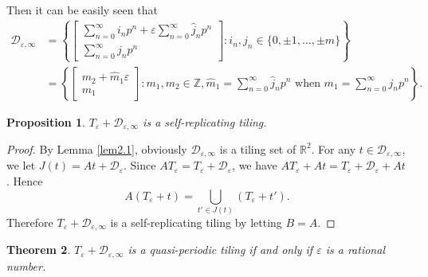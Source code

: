 \documentclass[12pt, reqno]{amsart}
\newtheorem{theorem}{Theorem}[section]
\newtheorem{Prop}[theorem]{Proposition}
\numberwithin{equation}{section}
\begin{document}
Then it can be easily seen that
\begin{align*}
{\mathcal D}_{\varepsilon,\infty} &= \left\{\left[\begin{array}{c}
\sum_{n=0}^\infty i_n p^n+ \varepsilon\sum_{n=0}^\infty \widehat{j}_n p^n\\
\sum_{n=0}^\infty j_n p^n
\end{array}\right]: i_n, j_n\in\{0,\pm1,\dots,\pm m\}\right\} \\
&=  \left\{\left[\begin{array}{c}
m_2+\widehat{m}_1\varepsilon\\
m_1
\end{array}\right]: m_1,m_2\in{\mathbb Z}, \widehat{m}_1=\sum_{n=0}^\infty \widehat{j}_n p^n \text{ when } m_1=\sum_{n=0}^\infty j_n p^n\right\}.
\end{align*}



\begin{Prop}
 $T_\varepsilon+{\mathcal D}_{\varepsilon,\infty}$ is a self-replicating tiling.
\end{Prop}


\begin{proof}
By Lemma \ref{lem2.1}, obviously ${\mathcal D}_{\varepsilon,\infty}$ is a tiling set of ${\mathbb R}^2$. For any $t\in {\mathcal D}_{\varepsilon,\infty}$, we let $J(t)=At+{\mathcal D}_\varepsilon$. Since $AT_\varepsilon=T_\varepsilon+{\mathcal D}_\varepsilon$, we have $AT_\varepsilon+At=T_\varepsilon+{\mathcal D}_\varepsilon+At$. Hence $$A(T_\varepsilon+t)=\bigcup_{t'\in J(t)}(T_\varepsilon+t').$$ Therefore $T_\varepsilon+{\mathcal D}_{\varepsilon,\infty}$ is a self-replicating tiling by letting $B=A$.
\end{proof}



\begin{theorem}
$T_\varepsilon+{\mathcal D}_{\varepsilon,\infty}$ is a quasi-periodic tiling if and only if $\varepsilon$ is a rational number.
\end{theorem}
\end{document}
